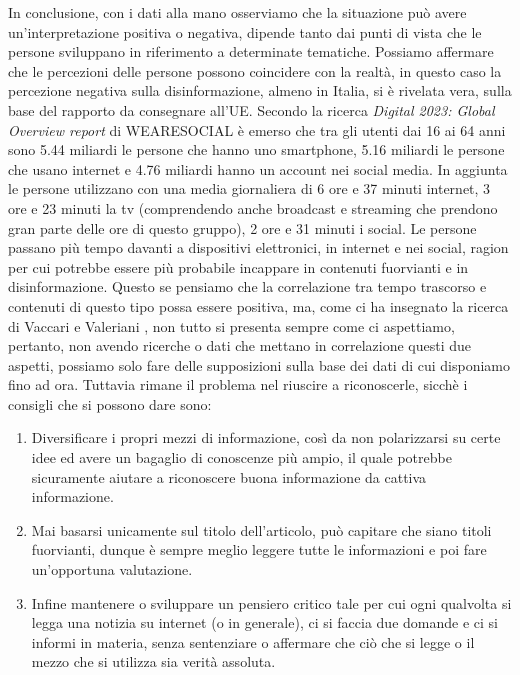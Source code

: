 \documentclass{article}
\begin{document}
\begin{justify}
    In conclusione, con i dati alla mano osserviamo che la situazione può avere un'interpretazione positiva o negativa, dipende tanto dai punti di vista che le persone sviluppano in riferimento a determinate tematiche. Possiamo affermare che le percezioni delle persone possono coincidere con la realtà, in questo caso la percezione negativa sulla disinformazione, almeno in Italia, si è rivelata vera, sulla base del rapporto da consegnare all'UE.
    Secondo la ricerca \textit{Digital 2023: Global Overview report} di WEARESOCIAL è emerso che tra gli utenti dai 16 ai 64 anni sono 5.44 miliardi le persone che hanno uno smartphone, 5.16 miliardi le persone che usano internet e 4.76 miliardi hanno un account nei social media. In aggiunta le persone utilizzano con una media giornaliera di 6 ore e 37 minuti internet, 3 ore e 23 minuti la tv (comprendendo anche broadcast e streaming che prendono gran parte delle ore di questo gruppo), 2 ore e 31 minuti i social.\citep{WEARESOCIAL}
    Le persone passano più tempo davanti a dispositivi elettronici, in internet e nei social, ragion per cui potrebbe essere più probabile incappare in contenuti fuorvianti e in disinformazione. Questo se pensiamo che la correlazione tra tempo trascorso e contenuti di questo tipo possa essere positiva, ma, come ci ha insegnato la ricerca di Vaccari e Valeriani \citep{vaccari_outside_2021}, non tutto si presenta sempre come ci aspettiamo, pertanto, non avendo ricerche o dati che mettano in correlazione questi due aspetti, possiamo solo fare delle supposizioni sulla base dei dati di cui disponiamo fino ad ora.
    Tuttavia rimane il problema nel riuscire a riconoscerle, sicchè i consigli che si possono dare sono:
    \begin{enumerate}
    \item Diversificare i propri mezzi di informazione, così da non polarizzarsi su certe idee ed avere un bagaglio di conoscenze più ampio, il quale potrebbe sicuramente aiutare a riconoscere buona informazione da cattiva informazione.
    \item Mai basarsi unicamente sul titolo dell'articolo, può capitare che siano titoli fuorvianti, dunque è sempre meglio leggere tutte le informazioni e poi fare un'opportuna valutazione.
    \item Infine mantenere o sviluppare un pensiero critico tale per cui ogni qualvolta si legga una notizia su internet (o in generale), ci si faccia due domande e ci si informi in materia, senza sentenziare o affermare che ciò che si legge o il mezzo che si utilizza sia verità assoluta.
    \end{enumerate}
\end{justify}
\begin{justify}
    
    
\end{justify}
    
\end{document}

